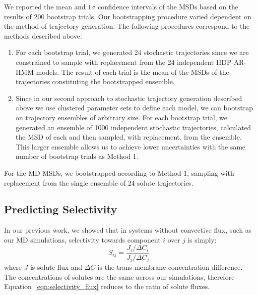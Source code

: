 \documentclass[journal=jpcbfk,manuscript=article]{achemso}
\begin{document}
  We reported the mean and $1 \sigma$ confidence intervals of the MSDs based on the 
  results of 200 bootstrap trials. Our bootstrapping procedure varied dependent on the
  method of trajectory generation. The following procedures correspond to the methods
  described above:
  \begin{enumerate}[label={Method \theenumi :}, leftmargin=3.5\parindent]
  	\item For each bootstrap trial, we generated 24 stochastic trajectories since we
  	are constrained to sample with replacement from the 24 independent HDP-AR-HMM models.
    The result of each trial is the mean of the MSDs of the trajectories
    constituting the bootstrapped ensemble.
    \item Since in our second approach to stochastic trajectory generation described 
    above we use clustered parameter sets to define each model, we can bootstrap on 
    trajectory ensembles of arbitrary size. 
    For each bootstrap trial, we generated an ensemble of 1000 independent
    stochastic trajectories, calculated the MSD of each and then sampled, with replacement,
    from the ensemble. This larger ensemble allows us to achieve lower uncertainties with
    the same number of bootstrap trials as Method 1. 
  \end{enumerate}

  For the MD MSDs, we bootstrapped according to Method 1, sampling with 
  replacement from the single ensemble of 24 solute trajectories.
  
  \subsection{Predicting Selectivity}\label{method:selectivity}
  
  In our previous work, we showed that in systems without convective flux, such
  as our MD simulations, selectivity towards component $i$ over $j$ is simply:
  \begin{equation}
  S_{ij} = \frac{J_i / \Delta C_i}{J_j / \Delta C_j}
  \label{eqn:selectivity_flux}
  \end{equation}
  where $J$ is solute flux and $\Delta C$ is the trans-membrane concentration
  difference.~\cite{coscia_capturing_2020} The concentrations of solutes are the
  same across our simulations, therefore Equation~\ref{eqn:selectivity_flux} 
  reduces to the ratio of solute fluxes. 
  
\end{document}

